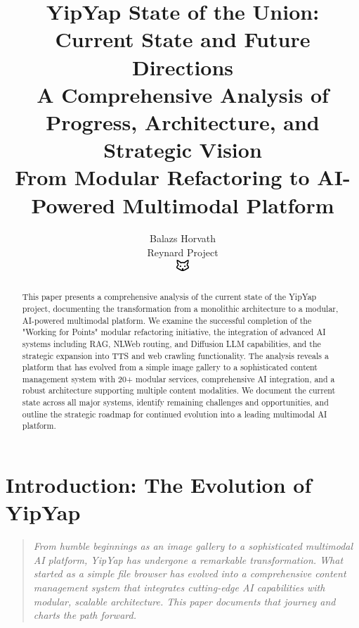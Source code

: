 \documentclass[11pt]{article}
\begin{document}
\title{\textbf{YipYap State of the Union: Current State and Future Directions} \\
\Large{A Comprehensive Analysis of Progress, Architecture, and Strategic Vision} \\
\large{From Modular Refactoring to AI-Powered Multimodal Platform}}

\author{Balazs Horvath\\
Reynard Project\\
\includegraphics[width=0.5cm]{../../shared-assets/favicon.pdf}}

\maketitle

\begin{abstract}
This paper presents a comprehensive analysis of the current state of the YipYap project, documenting the transformation from a monolithic architecture to a modular, AI-powered multimodal platform. We examine the successful completion of the "Working for Points" modular refactoring initiative, the integration of advanced AI systems including RAG, NLWeb routing, and Diffusion LLM capabilities, and the strategic expansion into TTS and web crawling functionality. The analysis reveals a platform that has evolved from a simple image gallery to a sophisticated content management system with 20+ modular services, comprehensive AI integration, and a robust architecture supporting multiple content modalities. We document the current state across all major systems, identify remaining challenges and opportunities, and outline the strategic roadmap for continued evolution into a leading multimodal AI platform.
\end{abstract}

\tableofcontents
\newpage

\section{Introduction: The Evolution of YipYap}

\begin{quote}
\emph{From humble beginnings as an image gallery to a sophisticated multimodal AI platform, YipYap has undergone a remarkable transformation. What started as a simple file browser has evolved into a comprehensive content management system that integrates cutting-edge AI capabilities with modular, scalable architecture. This paper documents that journey and charts the path forward.}
\end{quote}
\end{document}
